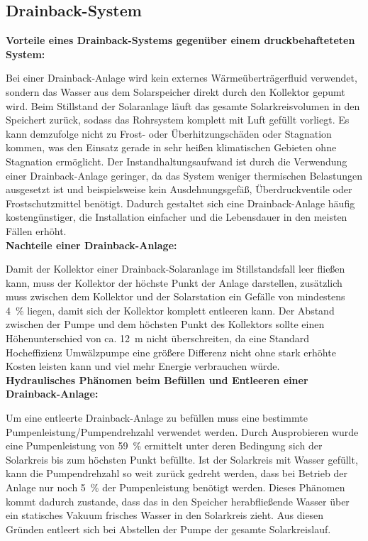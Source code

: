 \subsection{Drainback-System}

\textbf{Vorteile eines Drainback-Systems gegenüber einem druckbehafteteten System:}

Bei einer Drainback-Anlage wird kein externes Wärmeüberträgerfluid verwendet, sondern das Wasser aus dem Solarspeicher direkt durch den Kollektor gepumt wird. Beim Stillstand der Solaranlage läuft das gesamte Solarkreisvolumen in den Speichert zurück, sodass das Rohrsystem  komplett mit Luft gefüllt vorliegt. Es kann demzufolge nicht zu Frost- oder Überhitzungschäden oder Stagnation kommen, was den Einsatz gerade in sehr heißen klimatischen Gebieten ohne Stagnation ermöglicht. Der Instandhaltungsaufwand ist durch die Verwendung einer Drainback-Anlage geringer, da das System weniger thermischen Belastungen ausgesetzt ist und beispielsweise kein Ausdehnungsgefäß, Überdruckventile oder Frostschutzmittel benötigt. Dadurch gestaltet sich eine Drainback-Anlage häufig kostengünstiger, die Installation einfacher und die Lebensdauer in den meisten Fällen erhöht. \\

\textbf{Nachteile einer Drainback-Anlage:}

Damit der Kollektor einer Drainback-Solaranlage im Stillstandsfall leer fließen kann, muss der Kollektor der höchste Punkt der Anlage darstellen, zusätzlich muss zwischen dem Kollektor und der Solarstation ein Gefälle von mindestens \SI{4}{\percent} liegen, damit sich der Kollektor komplett entleeren kann. 
Der Abstand zwischen der Pumpe und dem höchsten Punkt des Kollektors sollte einen Höhenunterschied von ca. \SI{12}{\meter} nicht überschreiten, da eine Standard Hocheffizienz Umwälzpumpe eine größere Differenz nicht ohne stark erhöhte Kosten leisten kann und viel mehr Energie verbrauchen würde. \\

\textbf{Hydraulisches Phänomen beim Befüllen und Entleeren einer Drainback-Anlage:}

Um eine entleerte Drainback-Anlage zu befüllen muss eine bestimmte Pumpenleistung/Pumpendrehzahl verwendet werden. Durch Ausprobieren wurde eine Pumpenleistung von \SI{59}{\percent} ermittelt unter deren Bedingung sich der Solarkreis bis zum höchsten Punkt befüllte. Ist der Solarkreis mit Wasser gefüllt, kann die Pumpendrehzahl so weit zurück gedreht werden, dass bei Betrieb der Anlage nur noch \SI{5}{\percent} der Pumpenleistung benötigt werden. Dieses Phänomen kommt dadurch zustande, dass das in den Speicher herabfließende Wasser über ein statisches Vakuum frisches Wasser in den Solarkreis zieht. Aus diesen Gründen entleert sich bei Abstellen der Pumpe der gesamte Solarkreislauf. 

